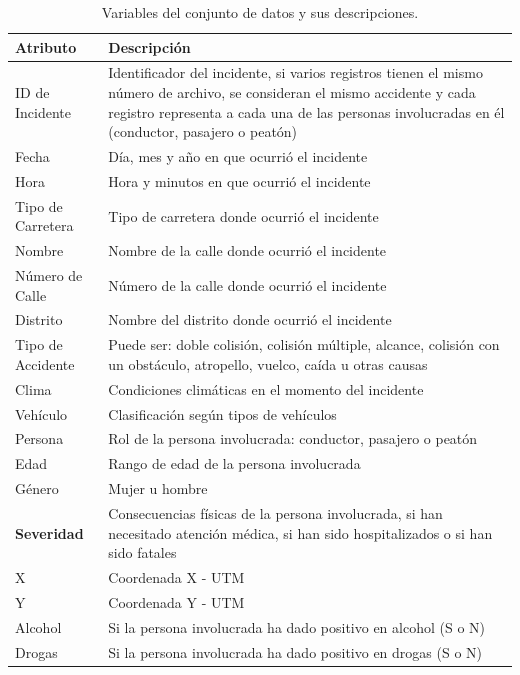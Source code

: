 \documentclass{uathesis-es}
\begin{document}
{%
\begin{table}[H]
	\begin{center}
		\begin{tabular}{|p{3cm}|p{11cm}|}
			\hline
			\textbf{Atributo} & \textbf{Descripción} \\ \hline \hline
			ID de Incidente  & Identificador del incidente, si varios registros tienen el mismo número de archivo, se consideran el mismo accidente y cada registro representa a cada una de las personas involucradas en él (conductor, pasajero o peatón)  \\ \hline
			Fecha  & Día, mes y año en que ocurrió el incidente \\ \hline
			Hora  & Hora y minutos en que ocurrió el incidente \\ \hline
			Tipo de Carretera & Tipo de carretera donde ocurrió el incidente \\ \hline
			Nombre & Nombre de la calle donde ocurrió el incidente \\ \hline
			Número de Calle & Número de la calle donde ocurrió el incidente  \\ \hline
			Distrito & Nombre del distrito donde ocurrió el incidente \\ \hline
			Tipo de Accidente  & Puede ser: doble colisión, colisión múltiple, alcance, colisión con un obstáculo, atropello, vuelco, caída u otras causas \\ \hline
			Clima  & Condiciones climáticas en el momento del incidente \\ \hline
			Vehículo  & Clasificación según tipos de vehículos \\ \hline
			Persona  & Rol de la persona involucrada: conductor, pasajero o peatón \\ \hline
			Edad  & Rango de edad de la persona involucrada \\ \hline
			Género  & Mujer u hombre \\ \hline
			\textbf{Severidad}  & Consecuencias físicas de la persona involucrada, si han necesitado atención médica, si han sido hospitalizados o si han sido fatales \\ \hline
			X   & Coordenada X - UTM \\ \hline
			Y   & Coordenada Y - UTM \\ \hline
			Alcohol & Si la persona involucrada ha dado positivo en alcohol (S o N) \\ \hline
			Drogas & Si la persona involucrada ha dado positivo en drogas (S o N) \\ \hline \hline
		\end{tabular}
	\end{center}
	\caption{Variables del conjunto de datos y sus descripciones.}
	\label{Datadescription}
\end{table}

}
\end{document}
